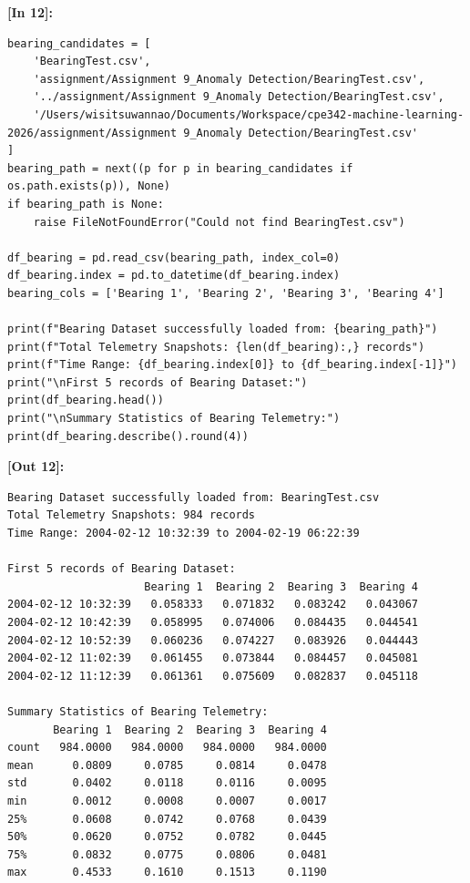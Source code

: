 \noindent\textbf{\small [In 12]:}
\begin{lstlisting}[style=pycode]
bearing_candidates = [
    'BearingTest.csv',
    'assignment/Assignment 9_Anomaly Detection/BearingTest.csv',
    '../assignment/Assignment 9_Anomaly Detection/BearingTest.csv',
    '/Users/wisitsuwannao/Documents/Workspace/cpe342-machine-learning-2026/assignment/Assignment 9_Anomaly Detection/BearingTest.csv'
]
bearing_path = next((p for p in bearing_candidates if os.path.exists(p)), None)
if bearing_path is None:
    raise FileNotFoundError("Could not find BearingTest.csv")

df_bearing = pd.read_csv(bearing_path, index_col=0)
df_bearing.index = pd.to_datetime(df_bearing.index)
bearing_cols = ['Bearing 1', 'Bearing 2', 'Bearing 3', 'Bearing 4']

print(f"Bearing Dataset successfully loaded from: {bearing_path}")
print(f"Total Telemetry Snapshots: {len(df_bearing):,} records")
print(f"Time Range: {df_bearing.index[0]} to {df_bearing.index[-1]}")
print("\nFirst 5 records of Bearing Dataset:")
print(df_bearing.head())
print("\nSummary Statistics of Bearing Telemetry:")
print(df_bearing.describe().round(4))
\end{lstlisting}
\vspace{0.2em}
\noindent\textbf{\small [Out 12]:}
\begin{lstlisting}[style=output]
Bearing Dataset successfully loaded from: BearingTest.csv
Total Telemetry Snapshots: 984 records
Time Range: 2004-02-12 10:32:39 to 2004-02-19 06:22:39

First 5 records of Bearing Dataset:
                     Bearing 1  Bearing 2  Bearing 3  Bearing 4
2004-02-12 10:32:39   0.058333   0.071832   0.083242   0.043067
2004-02-12 10:42:39   0.058995   0.074006   0.084435   0.044541
2004-02-12 10:52:39   0.060236   0.074227   0.083926   0.044443
2004-02-12 11:02:39   0.061455   0.073844   0.084457   0.045081
2004-02-12 11:12:39   0.061361   0.075609   0.082837   0.045118

Summary Statistics of Bearing Telemetry:
       Bearing 1  Bearing 2  Bearing 3  Bearing 4
count   984.0000   984.0000   984.0000   984.0000
mean      0.0809     0.0785     0.0814     0.0478
std       0.0402     0.0118     0.0116     0.0095
min       0.0012     0.0008     0.0007     0.0017
25%       0.0608     0.0742     0.0768     0.0439
50%       0.0620     0.0752     0.0782     0.0445
75%       0.0832     0.0775     0.0806     0.0481
max       0.4533     0.1610     0.1513     0.1190
\end{lstlisting}
